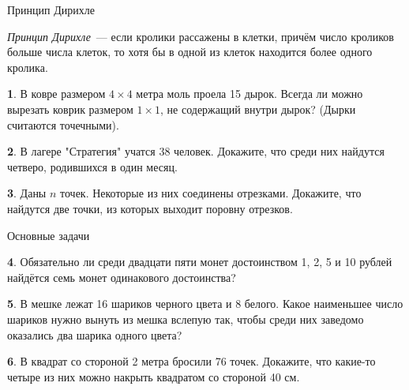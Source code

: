 \documentclass[b5paper,usehyperref, twoside]{article}
\theoremstyle{definition}
\theoremstyle{definition}
\newtheorem{Task}{}
\begin{document}
	
	
	
	\centerline{\LARGE Принцип Дирихле}
	
	\textit{Принцип Дирихле}~--- если кролики рассажены в клетки, причём число кроликов больше числа клеток, то хотя бы в одной из клеток находится более одного кролика.
	
	\begin{Task} 
		 В ковре размером $4 \times 4$ метра моль проела 15 дырок. Всегда ли можно вырезать коврик размером $1 \times 1$, не содержащий внутри дырок? (Дырки считаются точечными).
	 \end{Task}

	\begin{Task} 
		В лагере "Стратегия" учатся 38 человек. Докажите, что среди них найдутся четверо, родившихся в один месяц.
	 \end{Task}
	
	\begin{Task} 
		Даны $n$ точек. Некоторые из них соединены отрезками. Докажите, что найдутся две точки, из которых выходит поровну отрезков.
	\end{Task}

\centerline{\LARGE Основные задачи}
	\begin{Task} 
		 Обязательно ли среди двадцати пяти монет достоинством 1, 2, 5 и 10 рублей найдётся семь монет одинакового достоинства?
	 \end{Task}
 
	 \begin{Task} 
	 	В мешке лежат 16 шариков черного цвета и 8 белого. Какое наименьшее число шариков нужно вынуть из мешка вслепую так, чтобы среди них заведомо оказались два шарика одного цвета?
	 \end{Task}
 
	\begin{Task} 
		В квадрат со стороной 2 метра бросили 76 точек. Докажите, что какие-то четыре из них можно накрыть квадратом со стороной 40 см.
	\end{Task}
	
\end{document}

